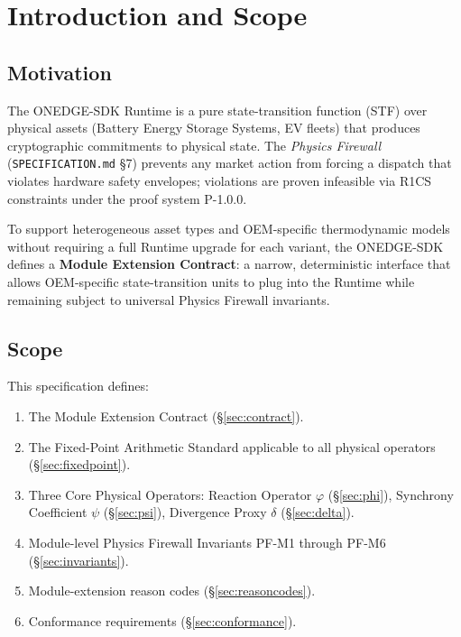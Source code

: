 \documentclass[11pt,letterpaper]{article}
\theoremstyle{definition}
\newcommand{\SDK}{\textsc{ONEDGE-SDK}}
\newcommand{\ph}{\varphi}       %
\newcommand{\sy}{\psi}          %
\newcommand{\dv}{\delta}        %
\begin{document}
\tableofcontents
\newpage

\section{Introduction and Scope}
\label{sec:intro}

\subsection{Motivation}

The \SDK{} Runtime is a pure state-transition function (STF) over physical assets (Battery Energy Storage Systems, EV fleets) that produces cryptographic commitments to physical state. The \textit{Physics Firewall} (\texttt{SPECIFICATION.md} §7) prevents any market action from forcing a dispatch that violates hardware safety envelopes; violations are proven infeasible via R1CS constraints under the proof system P-1.0.0.

To support heterogeneous asset types and OEM-specific thermodynamic models without requiring a full Runtime upgrade for each variant, the \SDK{} defines a \textbf{Module Extension Contract}: a narrow, deterministic interface that allows OEM-specific state-transition units to plug into the Runtime while remaining subject to universal Physics Firewall invariants.

\subsection{Scope}

This specification defines:
\begin{enumerate}[label=\arabic*.]
    \item The Module Extension Contract (§\ref{sec:contract}).
    \item The Fixed-Point Arithmetic Standard applicable to all physical operators (§\ref{sec:fixedpoint}).
    \item Three Core Physical Operators: Reaction Operator $\ph$ (§\ref{sec:phi}), Synchrony Coefficient $\sy$ (§\ref{sec:psi}), Divergence Proxy $\dv$ (§\ref{sec:delta}).
    \item Module-level Physics Firewall Invariants PF-M1 through PF-M6 (§\ref{sec:invariants}).
    \item Module-extension reason codes (§\ref{sec:reasoncodes}).
    \item Conformance requirements (§\ref{sec:conformance}).
\end{enumerate}
\end{document}
